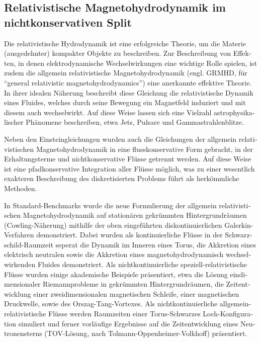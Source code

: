 \begin{otherlanguage}{german}
\begin{fullwidth}
\begin{center}
\begin{adjustwidth}{1cm}{1cm}
\subsection*{Relativistische Magnetohydrodynamik im nichtkonservativen Split}
Die relativistische Hydrodynamik ist eine erfolgreiche Theorie, um die Materie
(ausgedehnter) kompakter Objekte zu beschreiben.
Zur Beschreibung von Effekten,
in denen elektrodynamische Wechselwirkungen eine wichtige Rolle spielen, ist
zudem die allgemein relativistische Magnetohydrodynamik (engl.
GRMHD, für ``general relativistic magnetohydrodynamics'') eine anerkannte
effektive Theorie. In ihrer idealen Näherung beschreibt diese Gleichung die
relativistische Dynamik eines Fluides, welches durch seine Bewegung ein
Magnetfeld induziert und mit diesem auch wechselwirkt. Auf diese Weise lassen
sich eine Vielzahl astrophysikalischer Phänomene beschreiben, etwa Jets,
Pulsare und Gammastrahlenblitze.

Neben den Einsteingleichungen wurden auch die Gleichungen der allgemein
relativistischen Magnetohydrodynamik in eine flusskonservative Form gebracht, in der
Erhaltungsterme und nichtkonservative Flüsse getrennt werden. Auf diese Weise
ist eine pfadkonservative Integration aller Flüsse möglich, was zu einer
wesentlich exakteren Beschreibung des diskretisierten Problems führt
als herkömmliche Methoden.

In Standard-Benchmarks wurde die neue Formulierung der allgemein relativistischen
Magnetohydrodynamik auf stationären gekrümmten Hintergrundräumen (Cowling-Näherung)
mithilfe der oben eingeführten diskontinuierlichen Galerkin-Verfahren demonstriert.
Dabei wurden als kontinuierliche Flüsse in der Schwarzschild-Raumzeit seperat
die Dynamik im Inneren eines Torus, die Akkretion eines elektrisch neutralen
sowie die Akkretion eines magnetohydrodynamisch wechselwirkenden Fluides demonstriert.
Als nichtkontinuierliche speziell-relativistische Flüsse wurden
einige akademische Beispiele präsentiert, etwa die Lösung eindimensionaler
Riemannprobleme in gekrümmten Hintergrundräumen, die Zeitentwicklung einer
zweidimensionalen magnetischen Schleife, einer magnetischen Druckwelle, sowie
des Orszag-Tang-Vortexes. Als nichtkontinuierliche allgemein-relativistische
Flüsse werden Raumzeiten einer Torus-Schwarzes Loch-Konfiguration simuliert
und ferner vorläufige Ergebnisse auf die Zeitentwicklung eines Neutronensterns
(TOV-Lösung, nach Tolmann-Oppenheimer-Volkhoff) präsentiert.


\end{adjustwidth}
\end{center}
\end{fullwidth}
\end{otherlanguage}

